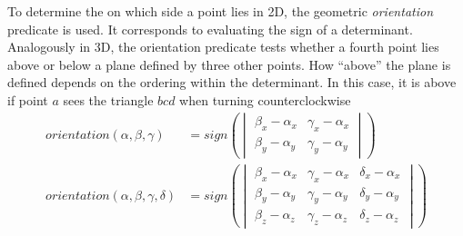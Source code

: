 \documentclass[../thesis.tex]{subfiles}
\begin{document}
To determine the on which side a point lies in 2D, the geometric \emph{orientation} predicate is used.
It corresponds to evaluating the sign of a determinant. Analogously in 3D, the orientation predicate
tests whether a fourth point lies above or below a plane defined by three other points.
How ``above'' the plane is defined depends on the ordering within the determinant. In this case,
it is above if point $a$ sees the triangle $bcd$ when turning counterclockwise 
\begin{align*}
  orientation(\alpha, \beta, \gamma) &= 
  sign\left(
  \begin{vmatrix}
    \beta_x -\alpha_x & \gamma_x - \alpha_x \\
    \beta_y -\alpha_y & \gamma_y - \alpha_y 
  \end{vmatrix}\right)
  \\
  orientation(\alpha, \beta, \gamma, \delta) &= 
  sign\left(
  \begin{vmatrix}
    \beta_x -\alpha_x & \gamma_x - \alpha_x & \delta_x - \alpha_x \\
    \beta_y -\alpha_y & \gamma_y - \alpha_y & \delta_y - \alpha_y \\
    \beta_z -\alpha_z & \gamma_z - \alpha_z & \delta_z - \alpha_z
  \end{vmatrix}\right)
\end{align*}
\end{document}
